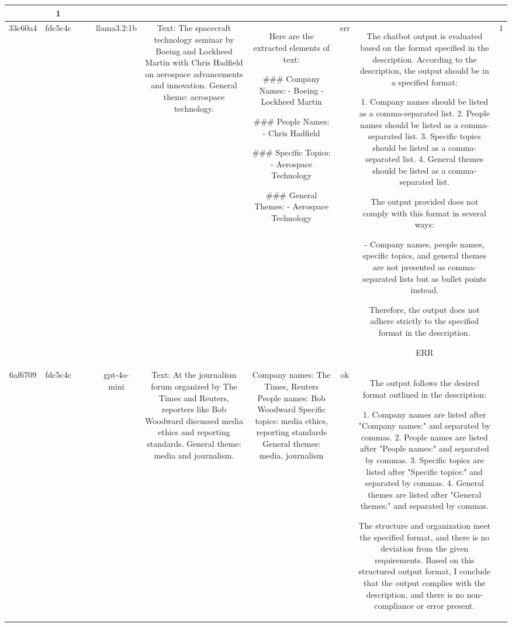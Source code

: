 \begin{table}[h!]
\begin{tabular}{|c|c|c|c|c|c|c|c|c|c|}
{ERR & 1\\
\hline
33c60a4 & fdc5c4c &  &  & llama3.2:1b & Text: The spacecraft technology seminar by Boeing and Lockheed Martin with Chris Hadfield on aerospace advancements and innovation. General theme: aerospace technology. & Here are the extracted elements of text:

### Company Names:
- Boeing
- Lockheed Martin

### People Names:
- Chris Hadfield

### Specific Topics:
- Aerospace Technology

### General Themes:
- Aerospace Technology & err & The chatbot output is evaluated based on the format specified in the description. According to the description, the output should be in a specified format:
   
1. Company names should be listed as a comma-separated list.
2. People names should be listed as a comma-separated list.
3. Specific topics should be listed as a comma-separated list.
4. General themes should be listed as a comma-separated list.

The output provided does not comply with this format in several ways:

- Company names, people names, specific topics, and general themes are not presented as comma-separated lists but as bullet points instead.

Therefore, the output does not adhere strictly to the specified format in the description.

ERR & 1\\
\hline
6af6709 & fdc5c4c &  &  & gpt-4o-mini & Text: At the journalism forum organized by The Times and Reuters, reporters like Bob Woodward discussed media ethics and reporting standards. General theme: media and journalism. & Company names: The Times, Reuters  
People names: Bob Woodward  
Specific topics: media ethics, reporting standards  
General themes: media, journalism & ok & The output follows the desired format outlined in the description:

1. Company names are listed after "Company names:" and separated by commas.
2. People names are listed after "People names:" and separated by commas.
3. Specific topics are listed after "Specific topics:" and separated by commas.
4. General themes are listed after "General themes:" and separated by commas.

The structure and organization meet the specified format, and there is no deviation from the given requirements. Based on this structured output format, I conclude that the output complies with the description, and there is no non-compliance or error present.

}
\end{tabular}
\end{table}
